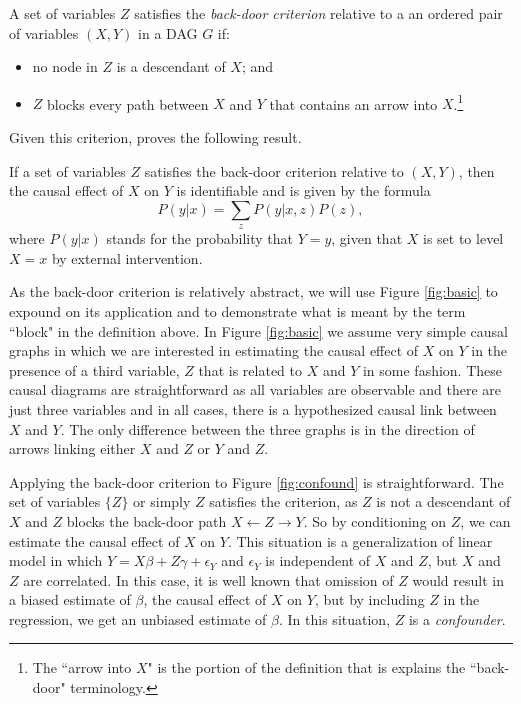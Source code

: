 \documentclass[11pt]{amsart}
\begin{document}
\begin{definition} %
A set of variables $Z$ satisfies the \emph{back-door criterion} relative to a an ordered pair of variables $(X, Y)$ in a 
	DAG $G$ if:
	\begin{itemize}
		\item no node in $Z$ is a descendant of $X$; and
		\item $Z$ blocks every path between $X$ and $Y$ that contains an arrow into $X$.\footnote{The ``arrow into $X$" is the portion of the definition that is explains the ``back-door" terminology.}
	\end{itemize}
\end{definition}
Given this criterion, \citet{Pearl:2009kh} proves the following result.
\begin{theorem}
	If a set of variables $Z$ satisfies the back-door criterion relative to $(X, Y)$, then the causal effect of $X$ on $Y$ is identifiable and is given by the formula 
	\[ P(y | x) = \sum_{z} P(y | x, z) P(z), \]
where $P(y|x)$ stands for the probability that $Y = y$, given that $X$ is set to level $X=x$ by external intervention.
\end{theorem}

As the back-door criterion is relatively abstract, we will use Figure \ref{fig:basic} to expound on its application and to demonstrate what is meant by the term ``block" in the definition above.
In Figure \ref{fig:basic} we assume very simple causal graphs in which we are interested in estimating the causal effect of $X$ on $Y$ in the presence of a third variable, $Z$ that is related to $X$ and $Y$ in some fashion.
These causal diagrams are straightforward as all variables are observable and there are just three variables and in all cases, there is a hypothesized causal link between $X$ and $Y$.
The only difference between the three graphs is in the direction of arrows linking either $X$ and $Z$ or $Y$ and $Z$.

Applying the back-door criterion to Figure \ref{fig:confound} is straightforward. The set of variables $\{Z\}$ or simply $Z$ satisfies the criterion, as $Z$ is not a descendant of $X$ and $Z$ blocks the back-door path $X \leftarrow Z \rightarrow Y$.
So by conditioning on $Z$, we can estimate the causal effect of $X$ on $Y$.
This situation is a generalization of linear model in which $Y = X \beta + Z \gamma + \epsilon_Y$ and $\epsilon_Y$ is independent of $X$ and $Z$, but $X$ and $Z$ are correlated.
In this case, it is well known that omission of $Z$ would result in a biased estimate of $\beta$, the causal effect of $X$ on $Y$, but by including $Z$ in the regression, we get an unbiased estimate of $\beta$.
In this situation, $Z$ is a \emph{confounder}.
\end{document}
